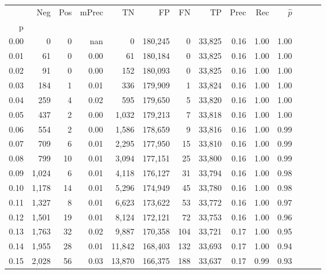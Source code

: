 \begin{tabular}{rrrrrrrrrrrrrr}
\toprule
{} &    Neg &    Pos & mPrec &       TN &       FP &      FN &      TP &  Prec &   Rec & $\hat{p}$ \\
p    &        &        &       &          &          &         &         &       &       &           \\
\midrule
0.00 &      0 &      0 &   nan &        0 &  180,245 &       0 &  33,825 &  0.16 &  1.00 &      1.00 \\
0.01 &     61 &      0 &  0.00 &       61 &  180,184 &       0 &  33,825 &  0.16 &  1.00 &      1.00 \\
0.02 &     91 &      0 &  0.00 &      152 &  180,093 &       0 &  33,825 &  0.16 &  1.00 &      1.00 \\
0.03 &    184 &      1 &  0.01 &      336 &  179,909 &       1 &  33,824 &  0.16 &  1.00 &      1.00 \\
0.04 &    259 &      4 &  0.02 &      595 &  179,650 &       5 &  33,820 &  0.16 &  1.00 &      1.00 \\
0.05 &    437 &      2 &  0.00 &    1,032 &  179,213 &       7 &  33,818 &  0.16 &  1.00 &      1.00 \\
0.06 &    554 &      2 &  0.00 &    1,586 &  178,659 &       9 &  33,816 &  0.16 &  1.00 &      0.99 \\
0.07 &    709 &      6 &  0.01 &    2,295 &  177,950 &      15 &  33,810 &  0.16 &  1.00 &      0.99 \\
0.08 &    799 &     10 &  0.01 &    3,094 &  177,151 &      25 &  33,800 &  0.16 &  1.00 &      0.99 \\
0.09 &  1,024 &      6 &  0.01 &    4,118 &  176,127 &      31 &  33,794 &  0.16 &  1.00 &      0.98 \\
0.10 &  1,178 &     14 &  0.01 &    5,296 &  174,949 &      45 &  33,780 &  0.16 &  1.00 &      0.98 \\
0.11 &  1,327 &      8 &  0.01 &    6,623 &  173,622 &      53 &  33,772 &  0.16 &  1.00 &      0.97 \\
0.12 &  1,501 &     19 &  0.01 &    8,124 &  172,121 &      72 &  33,753 &  0.16 &  1.00 &      0.96 \\
0.13 &  1,763 &     32 &  0.02 &    9,887 &  170,358 &     104 &  33,721 &  0.17 &  1.00 &      0.95 \\
0.14 &  1,955 &     28 &  0.01 &   11,842 &  168,403 &     132 &  33,693 &  0.17 &  1.00 &      0.94 \\
0.15 &  2,028 &     56 &  0.03 &   13,870 &  166,375 &     188 &  33,637 &  0.17 &  0.99 &      0.93 \\

\end{tabular}
